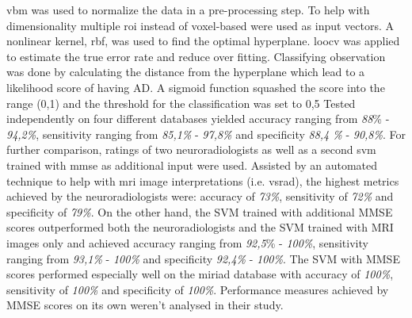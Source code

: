 \gls{vbm} was used to normalize the data in a pre-processing step. To help with dimensionality multiple \gls{roi} instead of voxel-based were used as input vectors. A nonlinear kernel, \gls{rbf}, was used to find the optimal hyperplane. \gls{loocv} was applied to estimate the true error rate and reduce over fitting. Classifying observation was done by calculating the distance from the hyperplane which lead to a likelihood score of having \gls{AD}. A sigmoid function squashed the score into the range (0,1) and the threshold for the classification was set to 0,5
Tested independently on four different databases yielded accuracy ranging from \textit{88}\% - \textit{94,2\%}, sensitivity ranging from \textit{85,1\%} - \textit{97,8\%} and specificity \textit{88,4 \%} - \textit{90,8\%}.
For further comparison, ratings of two neuroradiologists as well as a second \gls{svm} trained with \gls{mmse} as additional input were used. Assisted by an automated technique to help with \gls{mri} image interpretations (i.e. \gls{vsrad}), the highest metrics achieved by the neuroradiologists were: accuracy of \textit{73\%}, sensitivity of \textit{72\%} and specificity of \textit{79\%}. On the other hand, the SVM trained with additional MMSE scores outperformed both the neuroradiologists and the SVM trained with MRI images only and achieved accuracy ranging from \textit{92,5}\% - \textit{100\%}, sensitivity ranging from \textit{93,1\%} - \textit{100\%} and specificity \textit{92,4\%} - \textit{100\%}. The SVM with MMSE scores performed especially well on the \gls{miriad} database with accuracy of \textit{100\%}, sensitivity of \textit{100\%} and specificity of \textit{100\%}. Performance measures achieved by MMSE scores on its own weren't analysed in their study. 






